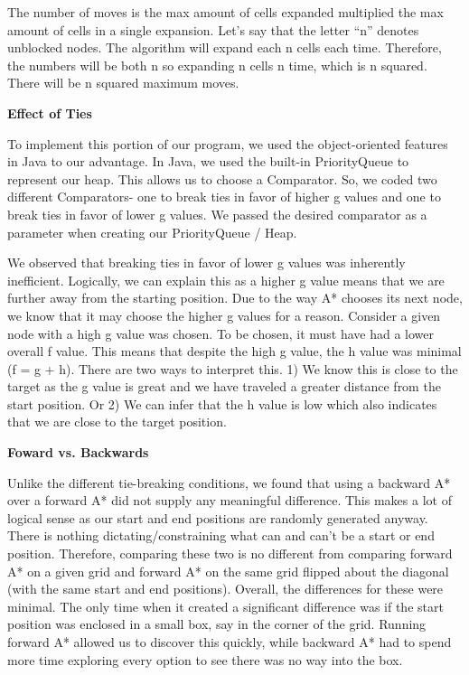 \documentclass[12pt, letterpaper, twoside]{article}
\begin{document}
\begin{flushleft}
    The number of moves is the max amount of cells expanded multiplied the max amount of cells in a single expansion. Let’s say that the letter “n” denotes unblocked nodes. The algorithm will expand each n cells each time. Therefore, the numbers will be both n so expanding n cells n time, which is n squared. There will be n squared maximum moves.
\end{flushleft}
\newpage
\begin{center}
    \textbf{Effect of Ties}
\end{center}
\begin{flushleft}
To implement this portion of our program, we used the object-oriented features in Java to our advantage. In Java, we used the built-in PriorityQueue to represent our heap. This allows us to choose a Comparator. So, we coded two different Comparators- one to break ties in favor of higher g values and one to break ties in favor of lower g values. We passed the desired comparator as a parameter when creating our PriorityQueue / Heap. 
\end{flushleft}
\begin{flushleft}
We observed that breaking ties in favor of lower g values was inherently inefficient. Logically, we can explain this as a higher g value means that we are further away from the starting position. Due to the way A* chooses its next node, we know that it may choose the higher g values for a reason. Consider a given node with a high g value was chosen. To be chosen, it must have had a lower overall f value. This means that despite the high g value, the h value was minimal (f = g + h). There are two ways to interpret this. 1) We know this is close to the target as the g value is great and we have traveled a greater distance from the start position. Or 2) We can infer that the h value is low which also indicates that we are close to the target position.
\end{flushleft}
\begin{center}
    \textbf{Foward vs. Backwards}
\end{center}
\begin{flushleft}
Unlike the different tie-breaking conditions, we found that using a backward A* over a forward A* did not supply any meaningful difference. This makes a lot of logical sense as our start and end positions are randomly generated anyway. There is nothing dictating/constraining what can and can’t be a start or end position. Therefore, comparing these two is no different from comparing forward A* on a given grid and forward A* on the same grid flipped about the diagonal (with the same start and end positions). Overall, the differences for these were minimal. The only time when it created a significant difference was if the start position was enclosed in a small box, say in the corner of the grid. Running forward A* allowed us to discover this quickly, while backward A* had to spend more time exploring every option to see there was no way into the box. 
\end{flushleft}
\end{document}
